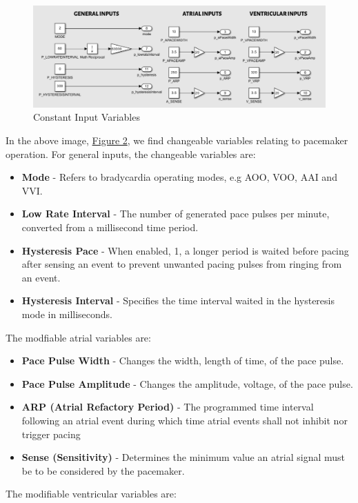 \documentclass{article}
\newcounter{subsubsubsection}[subsubsection]
\begin{document}
\newpage
{}

\begin{tcolorbox}
    \begin{figure}[H]
        \includegraphics[width=\textwidth]{ConstIn.png}
        \caption{Constant Input Variables}
        \label{ConstIn}
    \end{figure}
\end{tcolorbox}
In the above image, \hyperref[ConstIn]{Figure 2}, we find changeable variables 
relating to pacemaker operation. For general inputs, the changeable variables are:

\begin{itemize}
    \item \textbf{Mode} - Refers to bradycardia operating modes, e.g AOO, VOO, AAI and VVI.
    \item \textbf{Low Rate Interval} - The number of generated pace pulses per minute, converted from a millisecond time period. 
    \item \textbf{Hysteresis Pace} - When enabled, 1, a longer period is waited before pacing after sensing an event to prevent unwanted pacing pulses from ringing from an event. 
    \item \textbf{Hysteresis Interval} - Specifies the time interval waited in the hysteresis mode in milliseconds.
\end{itemize}
The modfiable atrial variables are:

\begin{itemize}
    \item \textbf{Pace Pulse Width} - Changes the width, length of time, of the pace pulse.
    \item \textbf{Pace Pulse Amplitude} - Changes the amplitude, voltage, of the pace pulse.
    \item \textbf{ARP (Atrial Refactory Period)} - The programmed time interval following an atrial event during which time atrial
            events shall not inhibit nor trigger pacing
    \item \textbf{Sense (Sensitivity)} - Determines the minimum value an atrial signal must be to be considered by the pacemaker. 
\end{itemize}
The modifiable ventricular variables are:
\end{document}

